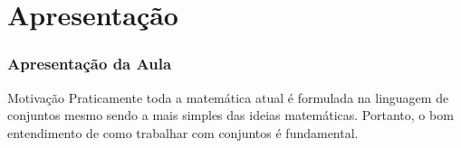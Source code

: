 \section{Apresentação}

\begin{frame}
    \frametitle{Apresentação da Aula}
    
    \begin{block}{Motivação}
        \justifying
        Praticamente toda a matemática atual é formulada na linguagem de conjuntos mesmo sendo a mais simples das ideias matemáticas. Portanto, o bom entendimento de como trabalhar com conjuntos é fundamental.
    \end{block}
\end{frame}

